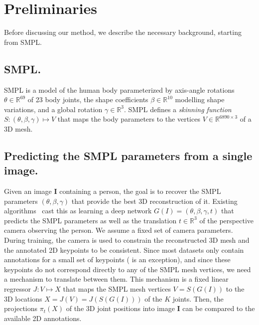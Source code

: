 \section{Preliminaries}\label{s:preliminaries}



Before discussing our method, we describe the necessary background, starting from SMPL\@.

\subsection{SMPL.}

SMPL is a model of the human body parameterized by axis-angle rotations $\theta \in \mathbb{R}^{69}$ of 23 body joints, the shape coefficients $\beta \in \mathbb{R}^{10}$ modelling shape variations, and a global rotation $\gamma \in \mathbb{R}^{3}$.
SMPL defines a \emph{skinning function}  $S: (\theta, \beta, \gamma) \mapsto V$ that maps the body parameters to the vertices $V \in \mathbb{R}^{6890\times 3}$ of a 3D mesh.

\subsection{Predicting the SMPL parameters from a single image.}

Given an image $\mathbf{I}$ containing a person, the goal is to recover the SMPL parameters $(\theta, \beta, \gamma)$ that provide the best 3D reconstruction of it.
Existing algorithms~\cite{kanazawa18learning} cast this as learning a deep network $G(I) = (\theta, \beta, \gamma, t)$ that predicts the SMPL parameters as well as the %
translation $t \in \mathbb{R}^3$ of the perspective camera observing the person. We assume a fixed set of camera parameters.
During training, the camera is used to constrain the reconstructed 3D mesh and the annotated 2D keypoints to be consistent.
Since most datasets only contain annotations for a small set of keypoints (\cite{guler2018densepose} is an exception), and since these keypoints do not correspond directly to any of the SMPL mesh vertices, we need a mechanism to translate between them.
This mechanism is a fixed linear regressor $J : V \mapsto X$ that maps the SMPL mesh vertices $V = S(G(I))$ to the 3D locations $X = J(V) = J(S(G(I)))$ of the $K$ joints.
Then, the projections $\pi_{t}(X)$ of the 3D joint positions into image $\mathbf{I}$ can be compared to the available 2D annotations.

